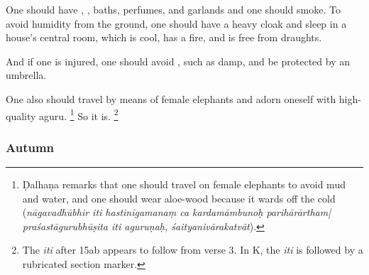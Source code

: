 \begin{translation}
\item[13--14ab] %
One should have , , baths, perfumes, and garlands and one should smoke. To avoid humidity from the ground, one should have a heavy cloak and sleep in a house's central room, which is cool, has a fire, and is free from draughts.
%

\item[14cd] %
And if one is injured, one should avoid , such as damp, and be protected by an umbrella.

\item[15ab]
One also should travel by means of female elephants and adorn oneself with high-quality \gls{aguru}.%
	\footnote{Ḍalhaṇa \citep[809]{vulgate} remarks that one should travel on female elephants to avoid mud and water, and one should wear aloe-wood because it wards off the cold (\emph{nāgavadhūbhir iti hastinīgamanaṃ ca kardamāmbunoḥ parihārārtham| praśastāgurubhūṣita iti aguruṇaḥ, śaityanivārakatvāt}).} %
So it is.%
	\footnote{The \emph{iti} after 15ab appears to follow from verse 3. In K, the \emph{iti} is followed by a rubricated section marker.}\\

%

\subsubsection{Autumn} %


\end{translation}
